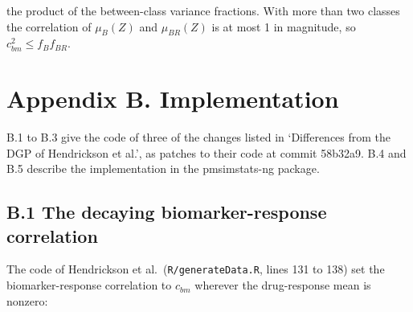 \documentclass[
  11pt,
]{article}
\newenvironment{Shaded}{\begin{snugshade}}{\end{snugshade}}
\newcommand{\AttributeTok}[1]{\textcolor[rgb]{0.13,0.29,0.53}{#1}}
\newcommand{\CommentTok}[1]{\textcolor[rgb]{0.56,0.35,0.01}{\textit{#1}}}
\newcommand{\ControlFlowTok}[1]{\textcolor[rgb]{0.13,0.29,0.53}{\textbf{#1}}}
\newcommand{\DecValTok}[1]{\textcolor[rgb]{0.00,0.00,0.81}{#1}}
\newcommand{\FunctionTok}[1]{\textcolor[rgb]{0.13,0.29,0.53}{\textbf{#1}}}
\newcommand{\NormalTok}[1]{#1}
\newcommand{\OtherTok}[1]{\textcolor[rgb]{0.56,0.35,0.01}{#1}}
\newcommand{\SpecialCharTok}[1]{\textcolor[rgb]{0.81,0.36,0.00}{\textbf{#1}}}
\newcommand{\StringTok}[1]{\textcolor[rgb]{0.31,0.60,0.02}{#1}}
\begin{document}
the product of the between-class variance fractions. With more than
two classes the correlation of \(\mu_B(Z)\) and \(\mu_{BR}(Z)\) is at most
1 in magnitude, so \(c_{bm}^2 \le f_B f_{BR}\).

\section*{Appendix B. Implementation}\label{appendix-b.-implementation}

B.1 to B.3 give the code of three of the changes listed in
`Differences from the DGP of Hendrickson et al.', as patches to their
code at commit 58b32a9. B.4 and B.5 describe the implementation in
the pmsimstats-ng package.

\subsection*{B.1 The decaying biomarker-response correlation}\label{b.1-the-decaying-biomarker-response-correlation}

The code of Hendrickson et al.~(\texttt{R/generateData.R}, lines 131 to 138)
set the biomarker-response correlation to \(c_{bm}\) wherever the
drug-response mean is nonzero:

\begin{Shaded}
\end{Shaded}
\end{document}
